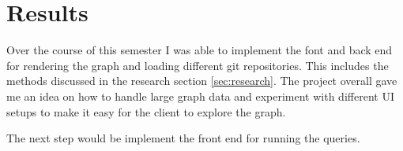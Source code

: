 \section{Results}
Over the course of this semester I was able to implement the font and back end for rendering the graph and loading different git repositories. This includes the methods discussed in the research section \ref{sec:research}. The project overall gave me an idea on how to handle large graph data and experiment with different UI setups to make it easy for the client to explore the graph.

The next step would be implement the front end for running the queries.